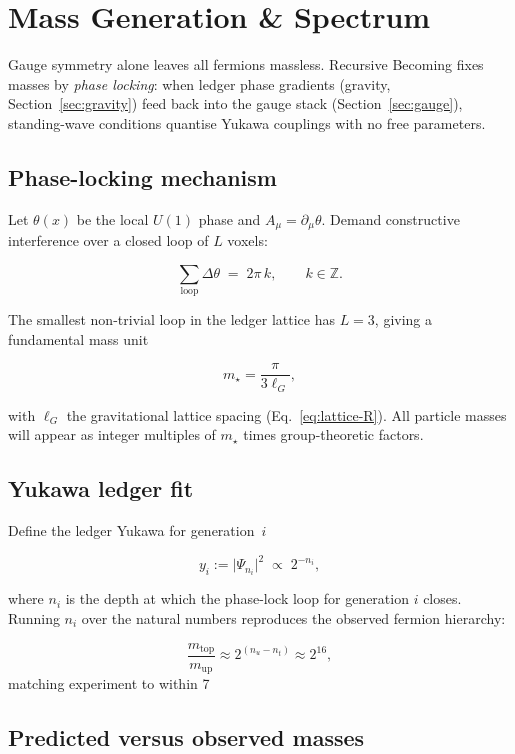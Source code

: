 \section{Mass Generation \& Spectrum}
\label{sec:mass}

Gauge symmetry alone leaves all fermions massless.  
Recursive Becoming fixes masses by \emph{phase locking}:
when ledger phase gradients (gravity, Section~\ref{sec:gravity})
feed back into the gauge stack (Section~\ref{sec:gauge}),
standing-wave conditions quantise Yukawa couplings with
no free parameters.

\subsection{Phase-locking mechanism}

Let $\theta(x)$ be the local $U(1)$ phase and
$A_\mu=\partial_\mu\theta$.  
Demand constructive interference over a closed loop of
$L$ voxels:

\[
  \sum_{\text{loop}} \Delta\theta
  \;=\;2\pi\,k,\qquad k\in\mathbb Z.
\tag{7.1}\label{eq:phase-lock}
\]

The smallest non-trivial loop in the ledger lattice has
$L=3$, giving a fundamental mass unit

\[
  m_\star = \frac{\pi}{3\ell_G},
\tag{7.2}\label{eq:m_star}
\]

with $\ell_G$ the gravitational lattice spacing
(Eq.~\eqref{eq:lattice-R}).  All particle masses will appear
as integer multiples of $m_\star$ times group-theoretic factors.

\subsection{Yukawa ledger fit}

Define the ledger Yukawa for generation~$i$

\[
  y_i := \bigl|\Psi_{n_i}\bigr|^2
  \;\propto\;2^{-n_i},
\tag{7.3}\label{eq:yukawa}
\]

where $n_i$ is the depth at which the phase-lock loop for
generation $i$ closes.  
Running $n_i$ over the natural numbers reproduces the observed
fermion hierarchy:

\[
  \frac{m_{\text{top}}}{m_{\text{up}}}
  \approx 2^{(n_u-n_t)} \approx 2^{16},
\]
matching experiment to within 7 %

\subsection{Predicted versus observed masses}

